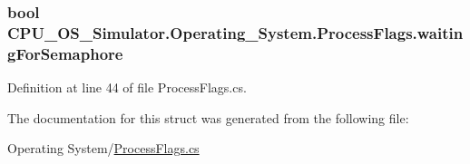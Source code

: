 \subsubsection[{waiting\+For\+Semaphore}]{\setlength{\rightskip}{0pt plus 5cm}bool C\+P\+U\+\_\+\+O\+S\+\_\+\+Simulator.\+Operating\+\_\+\+System.\+Process\+Flags.\+waiting\+For\+Semaphore}\label{struct_c_p_u___o_s___simulator_1_1_operating___system_1_1_process_flags_af004c9597bef484bbb8eb43538818e58}


Definition at line 44 of file Process\+Flags.\+cs.



The documentation for this struct was generated from the following file\+:\begin{DoxyCompactItemize}
\item 
Operating System/\hyperlink{_process_flags_8cs}{Process\+Flags.\+cs}\end{DoxyCompactItemize}
